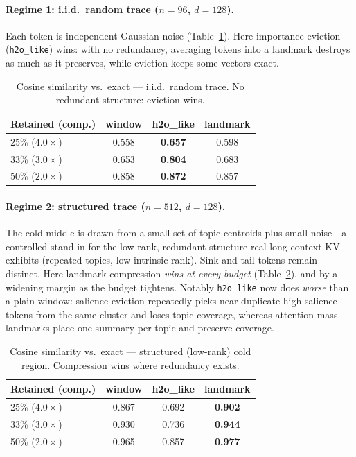 \documentclass[10pt,twocolumn]{article}
\newcommand{\code}[1]{\texttt{#1}}
\begin{document}
\paragraph{Regime 1: i.i.d.\ random trace ($n{=}96$, $d{=}128$).} Each token is
independent Gaussian noise (Table~\ref{tab:random}). Here importance eviction
(\code{h2o\_like}) wins: with no redundancy, averaging tokens into a landmark
destroys as much as it preserves, while eviction keeps some vectors exact.

\begin{table}[t]
\centering\small
\begin{tabular}{lccc}
\toprule
Retained (comp.) & window & h2o\_like & landmark \\
\midrule
25\% ($4.0\times$) & 0.558 & \textbf{0.657} & 0.598 \\
33\% ($3.0\times$) & 0.653 & \textbf{0.804} & 0.683 \\
50\% ($2.0\times$) & 0.858 & \textbf{0.872} & 0.857 \\
\bottomrule
\end{tabular}
\caption{Cosine similarity vs.\ exact --- i.i.d.\ random trace. No redundant
structure: eviction wins.}
\label{tab:random}
\end{table}

\paragraph{Regime 2: structured trace ($n{=}512$, $d{=}128$).} The cold middle is
drawn from a small set of topic centroids plus small noise---a controlled
stand-in for the low-rank, redundant structure real long-context KV exhibits
(repeated topics, low intrinsic rank). Sink and tail tokens remain distinct.
Here landmark compression \emph{wins at every budget}
(Table~\ref{tab:structured}), and by a widening margin as the budget tightens.
Notably \code{h2o\_like} now does \emph{worse} than a plain window: salience
eviction repeatedly picks near-duplicate high-salience tokens from the same
cluster and loses topic coverage, whereas attention-mass landmarks place one
summary per topic and preserve coverage.

\begin{table}[t]
\centering\small
\begin{tabular}{lccc}
\toprule
Retained (comp.) & window & h2o\_like & landmark \\
\midrule
25\% ($4.0\times$) & 0.867 & 0.692 & \textbf{0.902} \\
33\% ($3.0\times$) & 0.930 & 0.736 & \textbf{0.944} \\
50\% ($2.0\times$) & 0.965 & 0.857 & \textbf{0.977} \\
\bottomrule
\end{tabular}
\caption{Cosine similarity vs.\ exact --- structured (low-rank) cold region.
Compression wins where redundancy exists.}
\label{tab:structured}
\end{table}
\end{document}

